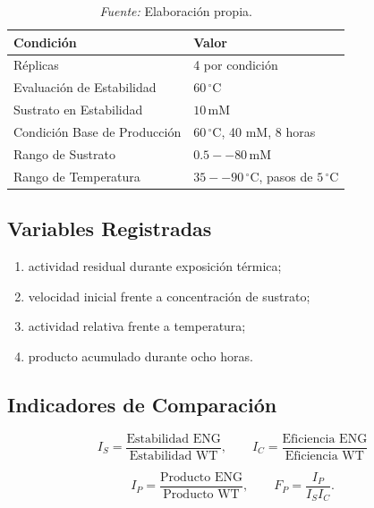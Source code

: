 \begin{table}[H]
\centering
\caption{Condiciones Generales del Análisis}
\caption*{\small\textit{Fuente:} Elaboración propia.}
\label{tab:reproducibilidad}
\renewcommand{\arraystretch}{1.25}
\begin{tabular}{|p{6.0cm}|p{6.2cm}|}
\hline
Condición & Valor \\ \hline
Réplicas & 4 por condición \\ \hline
Evaluación de Estabilidad & \(60\,^{\circ}\mathrm{C}\) \\ \hline
Sustrato en Estabilidad & \(10\,\mathrm{mM}\) \\ \hline
Condición Base de Producción & \(60\,^{\circ}\mathrm{C}\), 40 mM, 8 horas \\ \hline
Rango de Sustrato & \(0.5--80\,\mathrm{mM}\) \\ \hline
Rango de Temperatura & \(35--90\,^{\circ}\mathrm{C}\), pasos de \(5\,^{\circ}\mathrm{C}\) \\ \hline
\end{tabular}
\end{table}

\subsection{Variables Registradas}
\label{anx:variables_repro}
\label{subsec:variables_repro}

\begin{enumerate}
    \item actividad residual durante exposición térmica;
    \item velocidad inicial frente a concentración de sustrato;
    \item actividad relativa frente a temperatura;
    \item producto acumulado durante ocho horas.
\end{enumerate}


\subsection{Indicadores de Comparación}
\label{anx:indicadores_repro}

\begin{equation}
I_S=
\frac{\text{Estabilidad ENG}}
{\text{Estabilidad WT}},
\qquad
I_C=
\frac{\text{Eficiencia ENG}}
{\text{Eficiencia WT}}
\end{equation}

\begin{equation}
I_P=
\frac{\text{Producto ENG}}
{\text{Producto WT}},
\qquad
F_P=
\frac{I_P}{I_S I_C}.
\end{equation}

